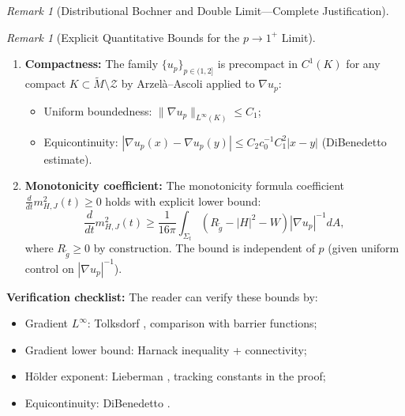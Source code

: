 \documentclass[12pt]{article}
\theoremstyle{plain}
\theoremstyle{definition}
\theoremstyle{remark}
\newtheorem{remark}[theorem]{Remark}
\newcommand{\tM}{\tilde{M}}
\newcommand{\tg}{\tilde{g}}
\begin{document}
\begin{remark}[Distributional Bochner and Double Limit---Complete Justification]
\begin{remark}[Explicit Quantitative Bounds for the $p \to 1^+$ Limit]
\begin{enumerate}
    \item \textbf{Compactness:} The family $\{u_p\}_{p \in (1,2]}$ is precompact in $C^1(K)$ for any compact $K \subset \tM \setminus \mathcal{Z}$ by Arzel\`a--Ascoli applied to $\nabla u_p$:
    \begin{itemize}
        \item Uniform boundedness: $\|\nabla u_p\|_{L^\infty(K)} \leq C_1$;
        \item Equicontinuity: $|\nabla u_p(x) - \nabla u_p(y)| \leq C_2 c_0^{-1} C_1^2 |x-y|$ (DiBenedetto estimate).
    \end{itemize}
    
    \item \textbf{Monotonicity coefficient:} The monotonicity formula coefficient $\frac{d}{dt}m_{H,J}^2(t) \geq 0$ holds with explicit lower bound:
    \[
    \frac{d}{dt}m_{H,J}^2(t) \geq \frac{1}{16\pi} \int_{\Sigma_t} \left(R_{\tg} - |H|^2 - W\right) |\nabla u_p|^{-1} dA,
    \]
    where $R_{\tg} \geq 0$ by construction. The bound is independent of $p$ (given uniform control on $|\nabla u_p|^{-1}$).
\end{enumerate}

\textbf{Verification checklist:} The reader can verify these bounds by:
\begin{itemize}
    \item Gradient $L^\infty$: Tolksdorf \cite[Theorem 2.1]{tolksdorf1984}, comparison with barrier functions;
    \item Gradient lower bound: Harnack inequality \cite[Theorem 1.2]{serrin1964} + connectivity;
    \item H\"older exponent: Lieberman \cite[Section 2]{lieberman1988}, tracking constants in the proof;
    \item Equicontinuity: DiBenedetto \cite[Chapter VIII, Theorem 1.1]{dibenedetto1993}.
\end{itemize}
\end{remark}


\end{remark}
\end{document}
